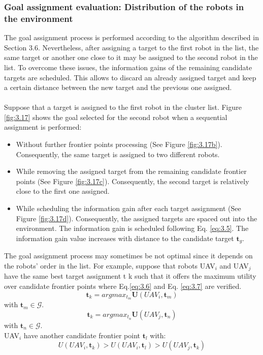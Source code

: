\documentclass[11pt,openany]{book}
\begin{document}
\subsubsection{Goal assignment evaluation: Distribution of the robots in the environment}
The goal assignment process is performed according to the algorithm described in Section 3.6. Nevertheless, after assigning a target to the ﬁrst robot in the list, the same target or another one close to it may be assigned to the second robot in the list. To overcome these issues, the information gains of the remaining candidate targets are scheduled. This allows to discard an already assigned target and keep a certain distance between the new target and the previous one assigned.\\\\
Suppose that a target is assigned to the ﬁrst robot in the cluster list. Figure \ref{fig:3.17} shows the goal selected for the second robot when a sequential assignment is performed:
\begin{itemize}
    \item Without further frontier points processing (See Figure \ref{fig:3.17b}). Consequently, the same target is assigned to two diﬀerent robots.
    \item While removing the assigned target from the remaining candidate frontier points (See Figure \ref{fig:3.17c}). Consequently, the second target is relatively close to the ﬁrst one assigned.
    \item While scheduling the information gain after each target assignment (See Figure \ref{fig:3.17d}). Consequently, the assigned targets are spaced out into the environment. The information gain is scheduled following Eq. \ref{eq:3.5}. The information gain value increases with distance to the candidate target $\mathbf{t}_g$.
\end{itemize}
The goal assignment process may sometimes be not optimal since it depends on the robots’ order in the list. For example, suppose that robots UAV$_i$ and UAV$_j$ have the same best target assignment t k such that it oﬀers the maximum utility over candidate frontier points where Eq.\ref{eq:3.6} and Eq. \ref{eq:3.7} are veriﬁed.
\begin{equation}\label{eq:3.6}
    \mathbf{t}_k=argmax_{t_m}\mathbf{U}(UAV_i,\mathbf{t}_m)
\end{equation}
with $\mathbf{t}_m \in \mathcal{G}$.
\begin{equation}\label{eq:3.7}
    \mathbf{t}_k=argmax_{t_n}\mathbf{U}(UAV_j, \mathbf{t}_n)
\end{equation}
with $\mathbf{t}_n \in \mathcal{G}$.\\
UAV$_i$ have another candidate frontier point $\mathbf{t}_l$ with:
\begin{equation}\label{eq:3.8}
    \mathbf{\mathit{U}}(UAV_i, \mathbf{t}_k) > \mathbf{\mathit{U}}(UAV_i,\mathbf{t}_l) > \mathbf{\mathit{U}}(UAV_j, \mathbf{t}_k)
\end{equation}
\end{document}
